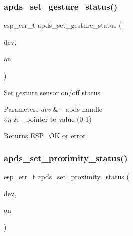 \subsubsection{\texorpdfstring{apds\+\_\+set\+\_\+gesture\+\_\+status()}{apds\_set\_gesture\_status()}}
{\footnotesize\ttfamily esp\+\_\+err\+\_\+t apds\+\_\+set\+\_\+gesture\+\_\+status (\begin{DoxyParamCaption}\item[{\hyperlink{structAPDS9960__Driver}{A\+P\+D\+S\+\_\+\+D\+EV}}]{dev,  }\item[{\hyperlink{vl53l0x__types_8h_aba7bc1797add20fe3efdf37ced1182c5}{uint8\+\_\+t} $\ast$}]{on }\end{DoxyParamCaption})}




\begin{DoxyItemize}
\item Set gesture sensor on/off status 
\end{DoxyItemize}


\begin{DoxyParams}{Parameters}
{\em dev} & -\/ apds handle \\
\hline
{\em on} & -\/ pointer to value (0-\/1) \\
\hline
\end{DoxyParams}
\begin{DoxyReturn}{Returns}
E\+S\+P\+\_\+\+OK or error 
\end{DoxyReturn}
\mbox{\label{group__APDS9960__SetStatusFunctions_ga8f7166cfb237b5fca3dfc34f03105c65}} 
\subsubsection{\texorpdfstring{apds\+\_\+set\+\_\+proximity\+\_\+status()}{apds\_set\_proximity\_status()}}
{\footnotesize\ttfamily esp\+\_\+err\+\_\+t apds\+\_\+set\+\_\+proximity\+\_\+status (\begin{DoxyParamCaption}\item[{\hyperlink{structAPDS9960__Driver}{A\+P\+D\+S\+\_\+\+D\+EV}}]{dev,  }\item[{\hyperlink{vl53l0x__types_8h_aba7bc1797add20fe3efdf37ced1182c5}{uint8\+\_\+t} $\ast$}]{on }\end{DoxyParamCaption})}




